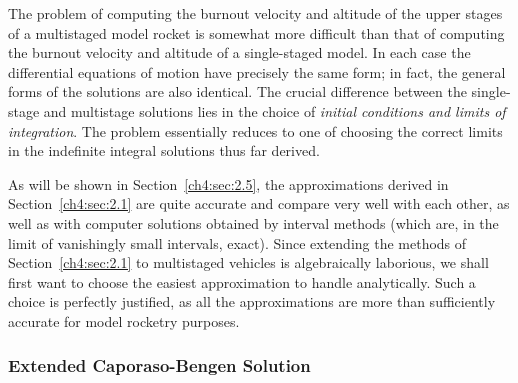 The problem of computing the burnout velocity and altitude of the upper stages of a multistaged
model rocket is somewhat more difficult than that of computing the burnout velocity and altitude of
a single-staged model. In each case the differential equations of motion have precisely the same
form; in fact, the general forms of the solutions are also identical. The crucial difference
between the single-stage and multistage solutions lies in the choice of \emph{initial conditions
and limits of integration}. The problem essentially reduces to one of choosing the correct limits
in the indefinite integral solutions thus far derived.

As will be shown in Section~\ref{ch4:sec:2.5}, the approximations derived in
Section~\ref{ch4:sec:2.1} are quite accurate and compare very well with each other, as well as with
computer solutions obtained by interval methods (which are, in the limit of vanishingly small
intervals, exact). Since extending the methods of Section~\ref{ch4:sec:2.1} to multistaged vehicles
is algebraically laborious, we shall first want to choose the easiest approximation to handle
analytically. Such a choice is perfectly justified, as all the approximations are more than
sufficiently accurate for model rocketry purposes.

\subsubsection{Extended Caporaso-Bengen Solution}\label{ch4:sec:2.2.1}

